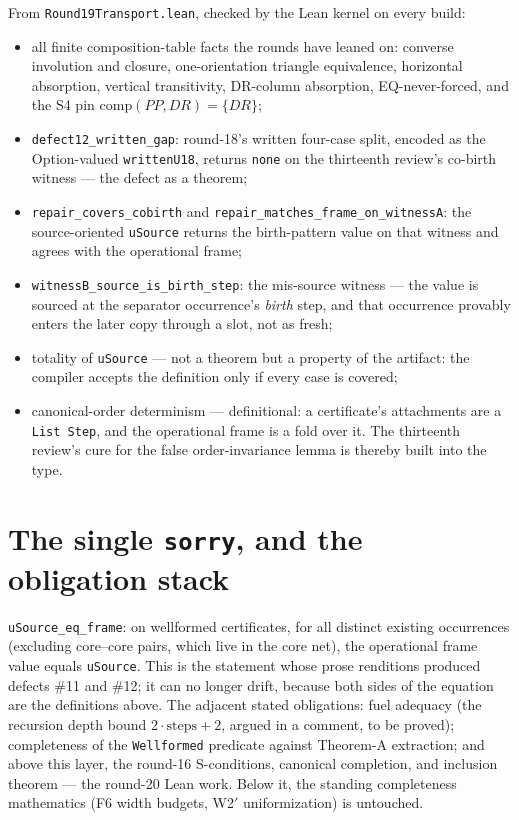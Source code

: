 \documentclass[11pt]{article}
\newcommand{\code}[1]{\texttt{#1}}
\begin{document}
From \code{Round19Transport.lean}, checked by the Lean kernel on every
build:
\begin{itemize}[leftmargin=2em]
\item all finite composition-table facts the rounds have leaned on:
converse involution and closure, one-orientation triangle equivalence,
horizontal absorption, vertical transitivity, DR-column absorption,
EQ-never-forced, and the S4 pin $\mathrm{comp}(PP,DR)=\{DR\}$;
\item \code{defect12\_written\_gap}: round-18's written four-case
split, encoded as the Option-valued \code{writtenU18}, returns
\code{none} on the thirteenth review's co-birth witness --- the defect
as a theorem;
\item \code{repair\_covers\_cobirth} and
\code{repair\_matches\_frame\_on\_witnessA}: the source-oriented
\code{uSource} returns the birth-pattern value on that witness and
agrees with the operational frame;
\item \code{witnessB\_source\_is\_birth\_step}: the mis-source witness
--- the value is sourced at the separator occurrence's \emph{birth}
step, and that occurrence provably enters the later copy through a
slot, not as fresh;
\item totality of \code{uSource} --- not a theorem but a property of
the artifact: the compiler accepts the definition only if every case
is covered;
\item canonical-order determinism --- definitional: a certificate's
attachments are a \code{List Step}, and the operational frame is a
fold over it.  The thirteenth review's cure for the false
order-invariance lemma is thereby built into the type.
\end{itemize}

\section{The single \code{sorry}, and the obligation stack}

\code{uSource\_eq\_frame}: on wellformed certificates, for all distinct
existing occurrences (excluding core--core pairs, which live in the
core net), the operational frame value equals \code{uSource}.  This is
the statement whose prose renditions produced defects \#11 and \#12;
it can no longer drift, because both sides of the equation are the
definitions above.  The adjacent stated obligations: fuel adequacy
(the recursion depth bound $2\cdot\mathrm{steps}+2$, argued in a
comment, to be proved); completeness of the \code{Wellformed}
predicate against Theorem-A extraction; and above this layer, the
round-16 S-conditions, canonical completion, and inclusion theorem ---
the round-20 Lean work.  Below it, the standing completeness
mathematics (F6 width budgets, W2$'$ uniformization) is untouched.
\end{document}
